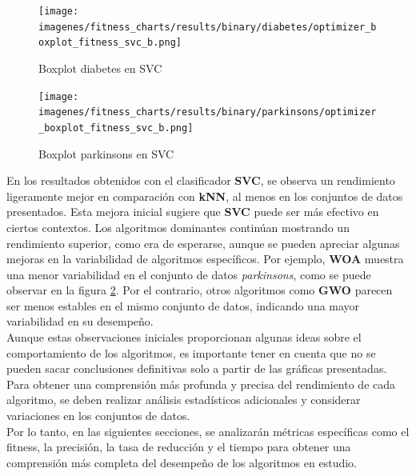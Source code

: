 \begin{figure}[htb]
    \centering
    \texttt{[image: imagenes/fitness\_charts/results/binary/diabetes/optimizer\_boxplot\_fitness\_svc\_b.png]}
    \caption{Boxplot diabetes en SVC}
    \label{fig:boxplot_diabetessvc}
\end{figure}

\begin{figure}[htb]
    \centering
    \texttt{[image: imagenes/fitness\_charts/results/binary/parkinsons/optimizer\_boxplot\_fitness\_svc\_b.png]}
    \caption{Boxplot parkinsons en SVC}
    \label{fig:boxplot_parkinsonssvc}
\end{figure}

En los resultados obtenidos con el clasificador \textbf{SVC}, se observa un rendimiento ligeramente mejor en comparación con \textbf{kNN}, al menos en los conjuntos de datos presentados. Esta mejora inicial sugiere que \textbf{SVC} puede ser más efectivo en ciertos contextos. Los algoritmos dominantes continúan mostrando un rendimiento superior, como era de esperarse, aunque se pueden apreciar algunas mejoras en la variabilidad de algoritmos específicos. Por ejemplo, \textbf{WOA} muestra una menor variabilidad en el conjunto de datos \textit{parkinsons}, como se puede observar en la figura \ref{fig:boxplot_parkinsonssvc}. Por el contrario, otros algoritmos como \textbf{GWO} parecen ser menos estables en el mismo conjunto de datos, indicando una mayor variabilidad en su desempeño.\\[6pt]
Aunque estas observaciones iniciales proporcionan algunas ideas sobre el comportamiento de los algoritmos, es importante tener en cuenta que no se pueden sacar conclusiones definitivas solo a partir de las gráficas presentadas. Para obtener una comprensión más profunda y precisa del rendimiento de cada algoritmo, se deben realizar análisis estadísticos adicionales y considerar variaciones en los conjuntos de datos.\\[6pt]
Por lo tanto, en las siguientes secciones, se analizarán métricas específicas como el fitness, la precisión, la tasa de reducción y el tiempo para obtener una comprensión más completa del desempeño de los algoritmos en estudio.

